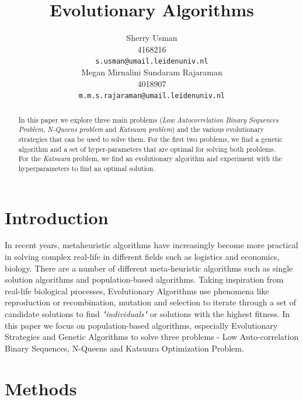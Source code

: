 \documentclass{article}
\title{Evolutionary Algorithms}
\author{
 Sherry Usman\\
  4168216\\
  \texttt{s.usman@umail.leidenuniv.nl}\\
   \And
 Megan Mirnalini Sundaram Rajaraman\\
  4018907\\
  \texttt{m.m.s.rajaraman@umail.leidenuniv.nl} \\
}
\begin{document}
\maketitle
 \begin{abstract}
In this paper we explore three main problems (\emph{Low Autocorrelation Binary Sequences Problem}, \emph{N-Queens problem} and \emph{Katsuura problem}) and the various evolutionary strategies that can be used to solve them. For the first two problems, we find a genetic algorithm and a set of hyper-parameters that are optimal for solving both problems. For the \emph{Katsuura} problem,  we find an evolutionary algorithm and experiment with the hyperparameters to find an optimal solution. 
\end{abstract}




\section{Introduction}\label{sec:intro}
In recent years, metaheuristic algorithms have increasingly become more practical in solving complex real-life in different fields such as logistics and economics, biology.  There are a number of different meta-heuristic algorithms such as single solution algorithms and population-based algorithms. Taking inspiration from real-life biological processes, Evolutionary Algorithms use phenomena like reproduction or recombination, mutation and selection to iterate through a set of candidate solutions to find \textit{"individuals"} or solutions with the highest fitness. In this paper we focus on population-based algorithms, especially Evolutionary Strategies and Genetic Algorithms to solve three problems - Low Auto-correlation Binary Sequences, N-Queens and Katsuura Optimization Problem. 
\section{Methods}
\end{document}
